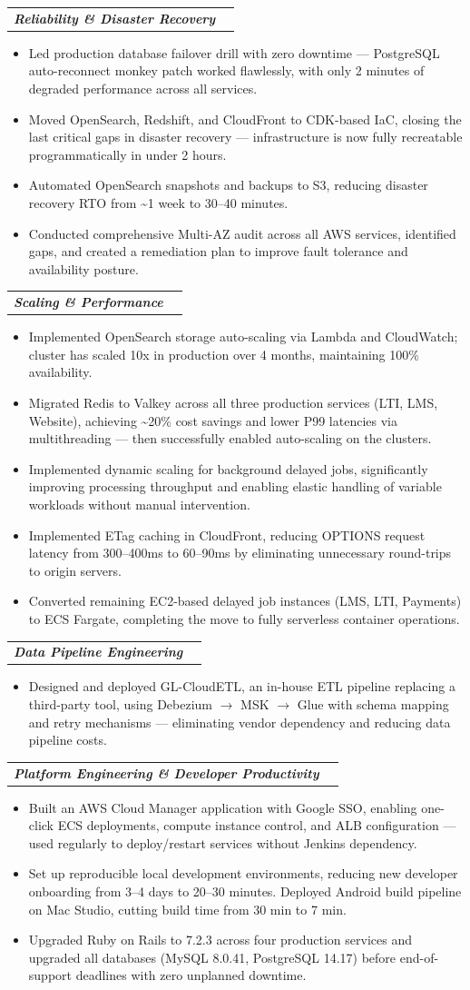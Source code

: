 \documentclass[letterpaper,11pt]{article}
\makeatletter
\newcommand{\resumeItem}[1]{\item\small{#1 \vspace{-2pt}}}
\newcommand{\resumeSubheadingContinue}[2]{
  \vspace{2pt}
  \begin{tabular*}{0.97\textwidth}[t]{l@{\extracolsep{\fill}}r}
    \textit{\small\textbf{#1}} \\
  \end{tabular*}\vspace{-7pt}
}
\newcommand{\resumeItemListStart}{\begin{itemize}}
\newcommand{\resumeItemListEnd}{\end{itemize}\vspace{-5pt}}
\makeatother
\begin{document}
    \resumeSubheadingContinue{Reliability \& Disaster Recovery}{}
    \resumeItemListStart
        \resumeItem{Led production database failover drill with zero downtime --- PostgreSQL auto-reconnect monkey patch worked flawlessly, with only 2 minutes of degraded performance across all services.}
        \resumeItem{Moved OpenSearch, Redshift, and CloudFront to CDK-based IaC, closing the last critical gaps in disaster recovery --- infrastructure is now fully recreatable programmatically in under 2 hours.}
        \resumeItem{Automated OpenSearch snapshots and backups to S3, reducing disaster recovery RTO from \textasciitilde1 week to 30--40 minutes.}
        \resumeItem{Conducted comprehensive Multi-AZ audit across all AWS services, identified gaps, and created a remediation plan to improve fault tolerance and availability posture.}
    \resumeItemListEnd

    \resumeSubheadingContinue{Scaling \& Performance}{}
    \resumeItemListStart
        \resumeItem{Implemented OpenSearch storage auto-scaling via Lambda and CloudWatch; cluster has scaled 10x in production over 4 months, maintaining 100\% availability.}
        \resumeItem{Migrated Redis to Valkey across all three production services (LTI, LMS, Website), achieving \textasciitilde20\% cost savings and lower P99 latencies via multithreading --- then successfully enabled auto-scaling on the clusters.}
        \resumeItem{Implemented dynamic scaling for background delayed jobs, significantly improving processing throughput and enabling elastic handling of variable workloads without manual intervention.}
        \resumeItem{Implemented ETag caching in CloudFront, reducing OPTIONS request latency from 300--400ms to 60--90ms by eliminating unnecessary round-trips to origin servers.}
        \resumeItem{Converted remaining EC2-based delayed job instances (LMS, LTI, Payments) to ECS Fargate, completing the move to fully serverless container operations.}
    \resumeItemListEnd

    \resumeSubheadingContinue{Data Pipeline Engineering}{}
    \resumeItemListStart
        \resumeItem{Designed and deployed GL-CloudETL, an in-house ETL pipeline replacing a third-party tool, using Debezium $\rightarrow$ MSK  $\rightarrow$ Glue with schema mapping and retry mechanisms --- eliminating vendor dependency and reducing data pipeline costs.}
    \resumeItemListEnd

    \resumeSubheadingContinue{Platform Engineering \& Developer Productivity}{}
    \resumeItemListStart
        \resumeItem{Built an AWS Cloud Manager application with Google SSO, enabling one-click ECS deployments, compute instance control, and ALB configuration --- used regularly to deploy/restart services without Jenkins dependency.}
        \resumeItem{Set up reproducible local development environments, reducing new developer onboarding from 3--4 days to 20--30 minutes. Deployed Android build pipeline on Mac Studio, cutting build time from 30 min to 7 min.}
        \resumeItem{Upgraded Ruby on Rails to 7.2.3 across four production services and upgraded all databases (MySQL 8.0.41, PostgreSQL 14.17) before end-of-support deadlines with zero unplanned downtime.}
    \resumeItemListEnd
\end{document}
